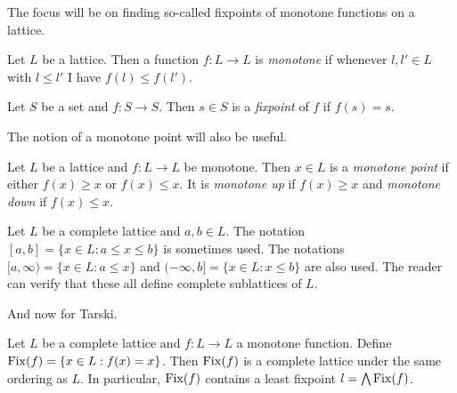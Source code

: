 The focus will be on finding so-called fixpoints of monotone functions on a lattice.
\begin{definition}
  Let $L$ be a lattice. Then a function $f : L \to L$ is \emph{monotone} if whenever $l, l' \in L$ with
  $l \leq l'$ I have $f(l) \leq f(l')$.
\end{definition}
\begin{definition}[Fixpoint]
  Let $S$ be a set and $f : S \to S$. Then $s \in S$ is a \emph{fixpoint} of $f$ if $f(s) = s$.
\end{definition}
The notion of a monotone point will also be useful.
\begin{definition}
  Let $L$ be a lattice and $f : L \to L$ be monotone. Then $x \in L$ is a \emph{monotone point}
  if either $f(x) \geq x$ or $f(x) \leq x$. It is \emph{monotone up} if $f(x) \geq x$ and \emph{monotone
  down} if $f(x) \leq x$.
\end{definition}
\begin{notation}
  Let $L$ be a complete lattice and $a, b \in L$. The notation $[a, b] = \{x \in L : a \leq x \leq b\}$ is sometimes
  used. The notations $[a, \infty) = \{x \in L : a \leq x\}$
  and $(-\infty, b] = \{x \in L : x \leq b\}$ are also used. 
  The reader can verify that these all define complete sublattices of $L$.
\end{notation}
And now for Tarski.
\begin{theorem}
  Let $L$ be a complete lattice and $f : L \to L$ a monotone function. Define 
  $\mathrm{Fix}(f) = \{x \in L : f(x) = x\}$. Then $\mathrm{Fix}(f)$ is a complete lattice under
  the same ordering as $L$. In particular, $\mathrm{Fix}(f)$ contains a least fixpoint $l = \bigwedge \mathrm{Fix}(f)$.
\end{theorem}

